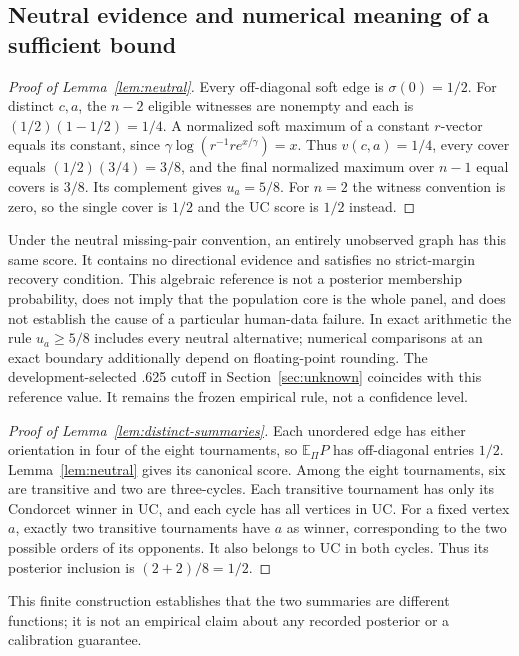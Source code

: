 \subsection{Neutral evidence and numerical meaning of a sufficient bound}\label{app:neutral}
\begin{proof}[Proof of Lemma~\ref{lem:neutral}]
Every off-diagonal soft edge is $\sigma(0)=1/2$. For distinct $c,a$, the $n-2$ eligible witnesses are nonempty and each is $(1/2)(1-1/2)=1/4$. A normalized soft maximum of a constant $r$-vector equals its constant, since $\gamma\log(r^{-1}r e^{x/\gamma})=x$. Thus $v(c,a)=1/4$, every cover equals $(1/2)(3/4)=3/8$, and the final normalized maximum over $n-1$ equal covers is $3/8$. Its complement gives $u_a=5/8$. For $n=2$ the witness convention is zero, so the single cover is $1/2$ and the UC score is $1/2$ instead.
\end{proof}
Under the neutral missing-pair convention, an entirely unobserved graph has this same score. It contains no directional evidence and satisfies no strict-margin recovery condition. This algebraic reference is not a posterior membership probability, does not imply that the population core is the whole panel, and does not establish the cause of a particular human-data failure. In exact arithmetic the rule $u_a\ge5/8$ includes every neutral alternative; numerical comparisons at an exact boundary additionally depend on floating-point rounding. The development-selected .625 cutoff in Section~\ref{sec:unknown} coincides with this reference value. It remains the frozen empirical rule, not a confidence level.

\begin{proof}[Proof of Lemma~\ref{lem:distinct-summaries}]
Each unordered edge has either orientation in four of the eight tournaments, so $\mathbb E_\Pi P$ has off-diagonal entries $1/2$. Lemma~\ref{lem:neutral} gives its canonical score. Among the eight tournaments, six are transitive and two are three-cycles. Each transitive tournament has only its Condorcet winner in UC, and each cycle has all vertices in UC. For a fixed vertex $a$, exactly two transitive tournaments have $a$ as winner, corresponding to the two possible orders of its opponents. It also belongs to UC in both cycles. Thus its posterior inclusion is $(2+2)/8=1/2$.
\end{proof}
This finite construction establishes that the two summaries are different functions; it is not an empirical claim about any recorded posterior or a calibration guarantee.


